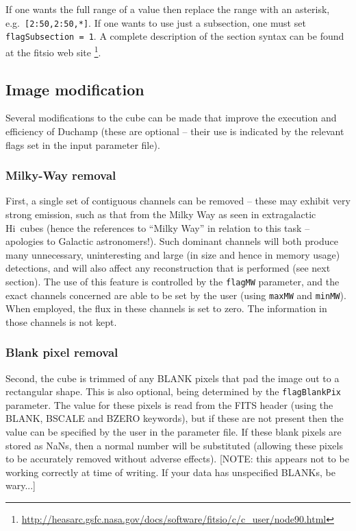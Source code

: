 \documentclass[12pt,a4paper]{article}
\newcommand{\eg}{e.g.\ }
\newcommand{\hi}{H{\sc i}}
\begin{document}
If one wants the full range of a value then replace the range with an
asterisk, \eg {\tt [2:50,2:50,*]}. If one wants to use just a
subsection, one must set {\tt flagSubsection = 1}. A complete
description of the section syntax can be found at the {\sc fitsio} web
site
\footnote{
\href{http://heasarc.gsfc.nasa.gov/docs/software/fitsio/c/c\_user/node90.html}%
{http://heasarc.gsfc.nasa.gov/docs/software/fitsio/c/c\_user/node90.html}}.

\subsection{Image modification}
\label{sec-modify}

Several modifications to the cube can be made that improve the
execution and efficiency of Duchamp (these are optional -- their
use is indicated by the relevant flags set in the input parameter
file).

\subsubsection{Milky-Way removal}

First, a single set of contiguous channels can be removed -- these may
exhibit very strong emission, such as that from the Milky Way as seen
in extragalactic \hi\ cubes (hence the references to ``Milky Way'' in
relation to this task -- apologies to Galactic astronomers!). Such
dominant channels will both produce many unnecessary, uninteresting
and large (in size and hence in memory usage) detections, and will
also affect any reconstruction that is performed (see next
section). The use of this feature is controlled by the {\tt flagMW}
parameter, and the exact channels concerned are able to be set by the
user (using {\tt maxMW} and {\tt minMW}). When employed, the flux in
these channels is set to zero. The information in those channels is
not kept.

\subsubsection{Blank pixel removal}

Second, the cube is trimmed of any BLANK pixels that pad the image
out to a rectangular shape. This is also optional, being determined by
the {\tt flagBlankPix} parameter. The value for these pixels is read from
the FITS header (using the BLANK, BSCALE and BZERO keywords), but if
these are not present then the value can be specified by the user in
the parameter file. If these blank pixels are stored as NaNs, then a
normal number will be substituted (allowing these pixels to be
accurately removed without adverse effects). [NOTE: this appears not
  to be working correctly at time of writing. If your data has
  unspecified BLANKs, be wary...]
\end{document}
